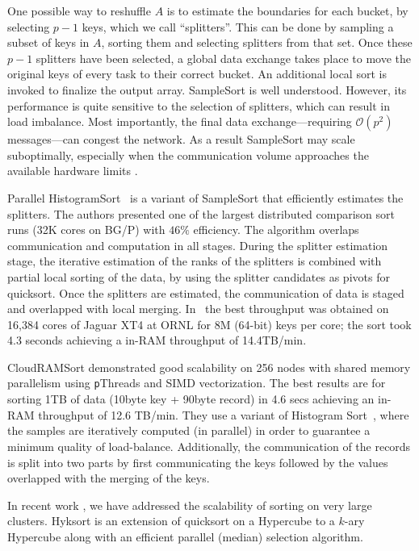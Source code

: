 One possible way to reshuffle $A$ is to estimate the boundaries for each bucket, by selecting $p-1$ keys, which we call
``splitters''. This can be done  by sampling a
subset of keys in $A$, sorting them and selecting splitters from that set. Once these $p-1$ splitters have been
selected, a global data exchange takes place to move the original keys of every task to their correct bucket.
An additional local sort is invoked to finalize the output array. SampleSort is well understood. However, its performance is quite sensitive to the selection of splitters, which can result in load imbalance. Most importantly, the final data exchange---requiring $\mathcal{O}(p^2)$ messages---can congest the network. As a result SampleSort may scale 
suboptimally, especially when the communication volume approaches the available hardware limits \cite{hyksort}.

Parallel HistogramSort~\cite{kale93,solomonik10} is
a variant of SampleSort that efficiently estimates the splitters. The authors presented
one of the largest distributed comparison sort runs (32K cores on
BG/P) with $46\%$ efficiency. The algorithm overlaps communication
and computation in all stages. During the splitter estimation
stage, the iterative estimation of the ranks of the splitters is
combined with partial local sorting of the data, by using the
splitter candidates as pivots for quicksort. Once the splitters
are estimated, the communication of data is staged and overlapped
with local merging. In~\cite{solomonik10} the best throughput was
obtained on 16,384 cores of Jaguar XT4 at ORNL for 8M (64-bit) keys
per core; the sort took 4.3 seconds achieving a in-RAM throughput of
14.4TB/min. 

CloudRAMSort \cite{kim12} demonstrated good scalability on 256 nodes with shared memory
parallelism using {\texttt pThreads} and SIMD vectorization. The
best results are for sorting 1TB of data (10byte key + 90byte
record) in 4.6 secs achieving an in-RAM throughput of 12.6 TB/min. They
use a variant of Histogram Sort~\cite{kale93}, where the
samples are iteratively computed (in parallel) in order to guarantee
a minimum quality of load-balance. Additionally, the communication of the records is split into two parts by first communicating the keys followed by the values overlapped with the merging of the keys. 

In recent work \cite{hyksort}, we have addressed the scalability of sorting on very large clusters. Hyksort\cite{hyksort} is an extension of quicksort on a Hypercube \cite{wagar87} to a $k$-ary Hypercube along with an efficient parallel (median) selection algorithm. 

